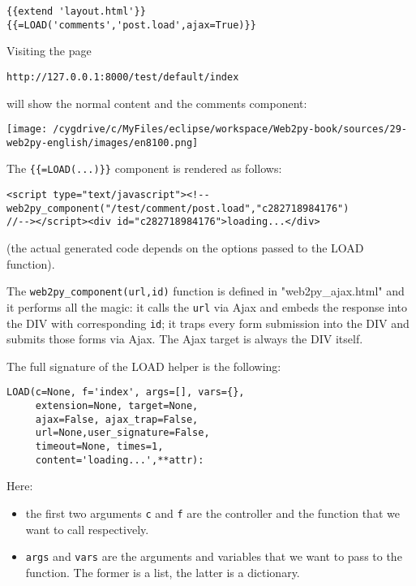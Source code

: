 \documentclass[justified,sixbynine,notoc]{tufte-book}
\def\ft{\small\tt}
\begin{document}
\begin{fullwidth}
\begin{lstlisting}[keywords={}]
{{extend 'layout.html'}}
{{=LOAD('comments','post.load',ajax=True)}}
\end{lstlisting}

Visiting the page

\begin{lstlisting}[keywords={}]
http://127.0.0.1:8000/test/default/index
\end{lstlisting}
\noindent will show the normal content and the comments component:


\goodbreak\begin{center}\texttt{[image: /cygdrive/c/MyFiles/eclipse/workspace/Web2py-book/sources/29-web2py-english/images/en8100.png]}\end{center}


The {\ft \{\{=LOAD(...)\}\}} component is rendered as follows:

\begin{lstlisting}[keywords={}]
<script type="text/javascript"><!--
web2py_component("/test/comment/post.load","c282718984176")
//--></script><div id="c282718984176">loading...</div>
\end{lstlisting}

(the actual generated code depends on the options passed to the LOAD function).

The {\ft web2py\_component(url,id)} function is defined in "web2py\_ajax.html" and it performs all the magic: it calls the {\ft url} via Ajax and embeds the response into the DIV with corresponding {\ft id}; it traps every form submission into the DIV and submits those forms via Ajax. The Ajax target is always the DIV itself.

The full signature of the LOAD helper is the following:

\begin{lstlisting}
LOAD(c=None, f='index', args=[], vars={},
     extension=None, target=None,
     ajax=False, ajax_trap=False,
     url=None,user_signature=False,
     timeout=None, times=1,
     content='loading...',**attr):
\end{lstlisting}

Here:
\begin{itemize}
\item the first two arguments {\ft c} and {\ft f} are the controller and the function that we want to call respectively.

\item {\ft args} and {\ft vars} are the arguments and variables that we want to pass to the function. The former is a list, the latter is a dictionary.


\end{itemize}
\end{fullwidth}
\end{document}
